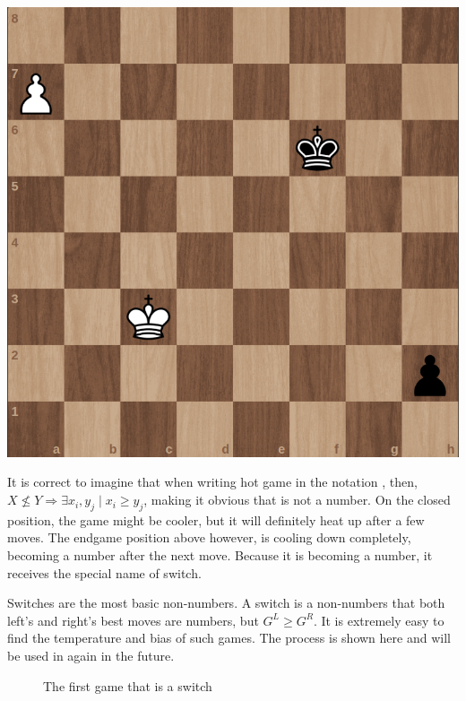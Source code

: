 \begin{center}
	\includegraphics[scale=0.15]{images/chess_hot} 
\end{center}

It is correct to imagine that when writing hot game \Gm{} in the notation , then, $X \nleq Y \Rightarrow \exists x_i, y_j \mid x_i \ge y_j$, making it obvious that \Gm{} is not a number. On the closed position, the game might be cooler, but it will definitely heat up after a few moves. The endgame position above however, is cooling down completely, becoming a number after the next move. Because it is becoming a number, it receives the special name of switch.

Switches are the most basic non-numbers. A switch is a non-numbers \Gm{} that both left's and right's best moves are numbers, but $G^L \ge G^R$. It is extremely easy to find the temperature and bias of such games. The process is shown here and will be used in again in the future.

\begin{figure} [!ht]
	\begin{center}
	\end{center}
	\caption{The first game that is a switch}
\end{figure}

